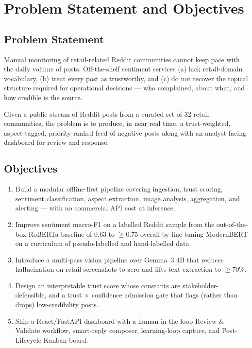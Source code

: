 \chapter{Problem Statement and Objectives}\label{ch:problem}

\section{Problem Statement}
Manual monitoring of retail-related Reddit communities cannot keep pace with
the daily volume of posts.  Off-the-shelf sentiment services (a) lack
retail-domain vocabulary, (b) treat every post as trustworthy, and (c) do not
recover the topical structure required for operational decisions --- who
complained, about what, and how credible is the source.

Given a public stream of Reddit posts from a curated set of 32 retail
communities, the problem is to produce, in near real time, a trust-weighted,
aspect-tagged, priority-ranked feed of negative posts along with an
analyst-facing dashboard for review and response.

\section{Objectives}
\begin{enumerate}
\item Build a modular offline-first pipeline covering ingestion, trust
      scoring, sentiment classification, aspect extraction, image analysis,
      aggregation, and alerting --- with no commercial API cost at inference.
\item Improve sentiment macro-F1 on a labelled Reddit sample from the
      out-of-the-box RoBERTa baseline of 0.63 to $\ge 0.75$ overall by
      fine-tuning ModernBERT on a curriculum of pseudo-labelled and
      hand-labelled data.
\item Introduce a multi-pass vision pipeline over Gemma~3 4B that reduces
      hallucination on retail screenshots to zero and lifts text
      extraction to $\ge 70\%$.
\item Design an interpretable trust score whose constants are
      stakeholder-defensible, and a \textsf{trust $\times$ confidence}
      admission gate that flags (rather than drops) low-credibility posts.
\item Ship a React/FastAPI dashboard with a human-in-the-loop Review \&
      Validate workflow, smart-reply composer, learning-loop capture, and
      Post-Lifecycle Kanban board.
\end{enumerate}

